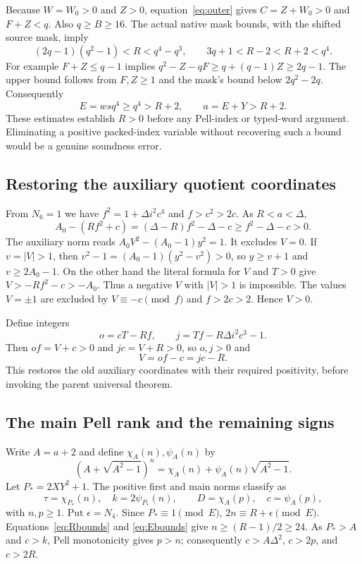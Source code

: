 \documentclass[11pt]{article}
\theoremstyle{remark}\newtheorem{remark}[theorem]{Remark}
\begin{document}
Because $W=W_0>0$ and $Z>0$, equation~\eqref{eq:outer} gives
$C=Z+W_0>0$ and $F+Z<q$. Also $q\ge B\ge16$. The actual native
mask bounds, with the shifted source mask, imply
\begin{equation}\label{eq:Rbounds}
 (2q-1)(q^2-1)<R<q^4-q^3,
 \qquad 3q+1<R-2<R+2<q^4.
\end{equation}
For example $F+Z\le q-1$ implies
$q^2-Z-qF\ge q+(q-1)Z\ge2q-1$. The upper bound follows
from $F,Z\ge1$ and the mask's bound below $2q^2-2q$.
Consequently
\begin{equation}\label{eq:Ebounds}
 E=wsq^4\ge q^4>R+2,\qquad a=E+Y>R+2.
\end{equation}
These estimates establish $R>0$ before any Pell-index or typed-word
argument. Eliminating a positive packed-index variable without
recovering such a bound would be a genuine soundness error.

\subsection{Restoring the auxiliary quotient coordinates}

From $N_6=1$ we have $f^2=1+\Delta i^2c^4$ and
$f>c^2>2c$. As $R<a<\Delta$,
\begin{equation}\label{eq:gapK}
 A_0-(Rf^2+c)=(\Delta-R)f^2-\Delta-c
 \ge f^2-\Delta-c>0.
\end{equation}
The auxiliary norm reads $A_0V^2-(A_0-1)y^2=1$.
It excludes $V=0$. If $v=|V|>1$, then
$v^2-1=(A_0-1)(y^2-v^2)>0$, so $y\ge v+1$ and
$v\ge2A_0-1$. On the other hand the literal formula for $V$
and $T>0$ give $V>-Rf^2-c>-A_0$. Thus a negative $V$ with
$|V|>1$ is impossible. The values $V=\pm1$ are excluded by
$V\equiv-c\pmod f$ and $f>2c>2$. Hence $V>0$.

Define integers
\begin{equation}\label{eq:restoreoj}
 o=cT-Rf,\qquad j=Tf-R\Delta i^2c^3-1.
\end{equation}
Then $of=V+c>0$ and $jc=V+R>0$, so $o,j>0$ and
\[
 V=of-c=jc-R.
\]
This restores the old auxiliary coordinates with their required
positivity, before invoking the parent universal theorem.

\subsection{The main Pell rank and the remaining signs}

Write $A=a+2$ and define $\chi_A(n),\psi_A(n)$ by
\[
 (A+\sqrt{A^2-1})^n=\chi_A(n)+\psi_A(n)\sqrt{A^2-1}.
\]
Let $P_*=2XY^2+1$. The positive first and main norms classify as
\[
 \tau=\chi_{P_*}(n),\quad k=2\psi_{P_*}(n),\qquad
 D=\chi_A(p),\quad c=\psi_A(p),
\]
with $n,p\ge1$. Put $\epsilon=N_4$. Since $P_*\equiv1\pmod E$,
$2n\equiv R+\epsilon\pmod E$. Equations~\eqref{eq:Rbounds}
and \eqref{eq:Ebounds} give $n\ge(R-1)/2\ge24$.
As $P_*>A$ and $c>k$, Pell monotonicity gives $p>n$; consequently
$c>A\Delta^2$, $c>2p$, and $c>2R$.
\end{document}
